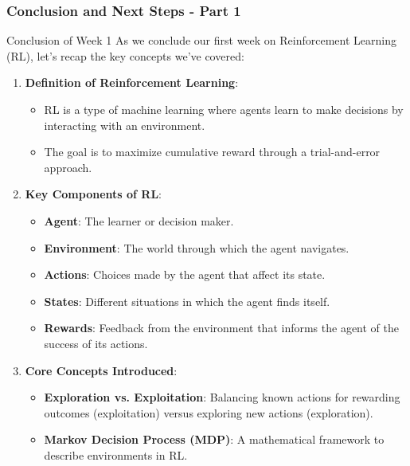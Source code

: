\documentclass[aspectratio=169]{beamer}
\begin{document}
\begin{frame}[fragile]
    \frametitle{Conclusion and Next Steps - Part 1}
    \begin{block}{Conclusion of Week 1}
        As we conclude our first week on Reinforcement Learning (RL), let’s recap the key concepts we’ve covered:
    \end{block}
    
    \begin{enumerate}
        \item \textbf{Definition of Reinforcement Learning}:
          \begin{itemize}
              \item RL is a type of machine learning where agents learn to make decisions by interacting with an environment. 
              \item The goal is to maximize cumulative reward through a trial-and-error approach.
          \end{itemize}
          
        \item \textbf{Key Components of RL}:
          \begin{itemize}
              \item \textbf{Agent}: The learner or decision maker.
              \item \textbf{Environment}: The world through which the agent navigates.
              \item \textbf{Actions}: Choices made by the agent that affect its state.
              \item \textbf{States}: Different situations in which the agent finds itself.
              \item \textbf{Rewards}: Feedback from the environment that informs the agent of the success of its actions.
          \end{itemize}
          
        \item \textbf{Core Concepts Introduced}:
          \begin{itemize}
              \item \textbf{Exploration vs. Exploitation}: Balancing known actions for rewarding outcomes (exploitation) versus exploring new actions (exploration).
              \item \textbf{Markov Decision Process (MDP)}: A mathematical framework to describe environments in RL.
          \end{itemize}
    \end{enumerate}
\end{frame}
\end{document}
